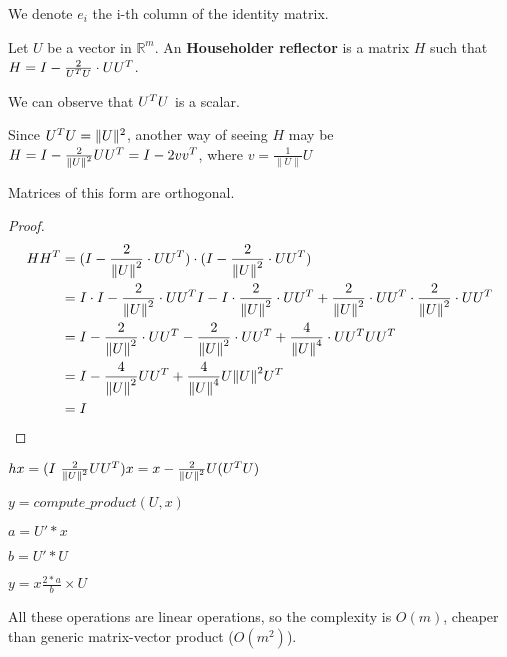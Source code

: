 \documentclass[computationalMathematics.tex]{subfiles}
\begin{document}
  We denote $e_{i}$ the i-th column of the identity matrix.

\begin{definition}
  Let $U$ be a vector in $\mathds{R}^m$. An \textbf{Householder reflector} is a matrix $H$ such that $H = I - \frac{2}{{U}^{T}U} \cdot U {U}^{T}$.
  
  We can observe that ${U}^{T}U$ is a scalar.

    Since ${U}^{T}U = \|U\|^2$, another way of seeing $H$ may be $H = I - \frac{2}{{\|U\|}^{2}} U {U}^{T} = I - 2v {v}^{T}$, where $v = \frac{1}{\|U\|}U$

  
  \end{definition}
\begin{lemma}
  Matrices of this form are orthogonal.
\end{lemma}

\begin{proof}
  \begin{equation}
    \begin{split}
      H{H}^{T} & = (I-\frac{2}{{\|U\|}^{2}} \cdot U {U}^{T}) \cdot (I-\frac{2}{{\|U\|}^{2}} \cdot U {U}^{T})\\
      & = I\cdot I - \frac{2}{{\|U\|}^{2}} \cdot U {U}^{T} I-I \cdot \frac{2}{{\|U\|}^{2}} \cdot U {U}^{T} + \frac{2}{{\|U\|}^{2}} \cdot U {U}^{T} \cdot \frac{2}{{\|U\|}^{2}} \cdot U {U}^{T}\\
      & = I - \frac{2}{{\|U\|}^{2}} \cdot U {U}^{T} - \frac{2}{{\|U\|}^{2}} \cdot U {U}^{T} + \frac{4}{{\|U\|}^{4}} \cdot U{U}^{T} U {U}^{T}\\
      & = I - \frac{4}{{\|U\|}^{2}} U {U}^{T} + \frac{4}{{\|U\|}^{4}} U {\|U\|}^{2} {U}^{T}\\
      & = I
    \end{split}
  \end{equation}
\end{proof}

\begin{example}
$hx = (I \ \frac{2}{{\|U\|}^{2}} U {U}^{T})x = x - \frac{2}{{\|U\|}^{2}} U ({U}^{T} U)$

$y = compute\_product(U,x)$

$a = U' * x$

$b=U' * U$

$y = x \frac{2*a}{b} \times U$

All these operations are linear operations, so the complexity is $O(m)$, cheaper than generic matrix-vector product ($O(m^2)$).
\end{example}
\end{document}
